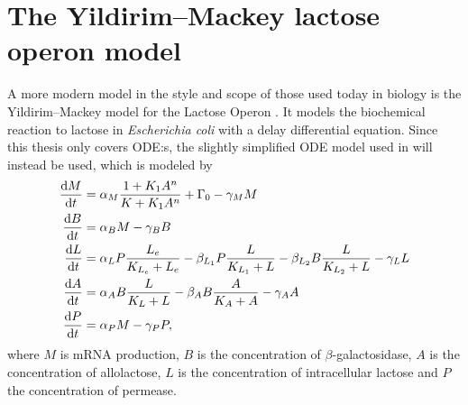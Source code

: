 \section{The Yildirim--Mackey lactose operon model}

A more modern model in the style and scope of those used today in biology is the Yildirim--Mackey model for the Lactose Operon \cite{yildirim2003feedback}.
It models the biochemical reaction to lactose in \textit{Escherichia coli} with a delay differential equation.
Since this thesis only covers ODE:s, the slightly simplified ODE model used in \cite{yildirim2011deterministic} will instead be used, which is modeled by
\begin{subequations} \label{eq:lac-operon}
  \begin{align}
    \diff{M}{t} &= \alpha_M \frac{1 + K_1 A^n}{K + K_1 A^n} + \Gamma_0 - \gamma_M M \label{eq:lac-operon-a}\\
    \diff{B}{t} &= \alpha_B M - \gamma_B B \\
    \diff{L}{t} &= \alpha_L P \frac{L_e}{K_{L_e} + L_e} - \beta_{L_1} P \frac{L}{K_{L_1} + L} - \beta_{L_2} B \frac{L}{K_{L_2} + L} - \gamma_L L \\
    \diff{A}{t} &= \alpha_A B \frac{L}{K_L + L} - \beta_A B \frac{A}{K_A + A} - \gamma_A A \\
    \diff{P}{t} &= \alpha_P M - \gamma_P P,
  \end{align}
\end{subequations}
where \(M\) is mRNA production, \(B\) is the concentration of \(\beta\)-galactosidase, \(A\) is the concentration of allolactose, \(L\) is the concentration of intracellular lactose and \(P\) the concentration of permease.
